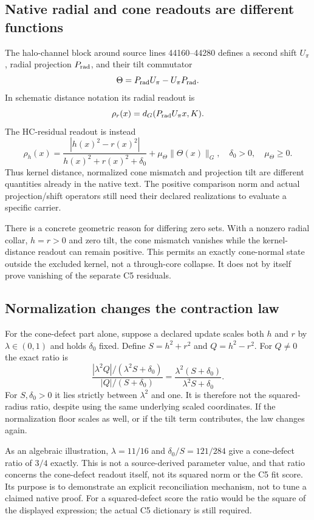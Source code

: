 \documentclass[11pt,a4paper]{article}
\begin{document}
\subsection{Native radial and cone readouts are different functions}
The halo-channel block around source lines 44160--44280 defines a second
shift $U_\pi$, radial projection $P_{\rm rad}$, and their tilt commutator
\[
\Theta=P_{\rm rad}U_\pi-U_\pi P_{\rm rad}.
\]
In schematic distance notation its radial readout is
\[
\rho_r(x)=d_G(P_{\rm rad}U_\pi x,K).
\]
The HC-residual readout is instead
\[
\rho_h(x)=\frac{|h(x)^2-r(x)^2|}{h(x)^2+r(x)^2+\delta_0}
+\mu_\Theta\|\Theta(x)\|_G,
\quad \delta_0>0,\quad\mu_\Theta\ge0.
\]
Thus kernel distance, normalized cone mismatch and projection tilt are
different quantities already in the native text. The positive comparison
norm and actual projection/shift operators still need their declared
realizations to evaluate a specific carrier.

There is a concrete geometric reason for differing zero sets. With a
nonzero radial collar, $h=r>0$ and zero tilt, the cone mismatch vanishes
while the kernel-distance readout can remain positive. This permits an
exactly cone-normal state outside the excluded kernel, not a through-core
collapse. It does not by itself prove vanishing of the separate C5 residuals.

\subsection{Normalization changes the contraction law}
For the cone-defect part alone, suppose a declared update scales both
$h$ and $r$ by $\lambda\in(0,1)$ and holds $\delta_0$ fixed. Define
$S=h^2+r^2$ and $Q=h^2-r^2$. For $Q\ne0$ the exact ratio is
\[
\frac{|\lambda^2Q|/(\lambda^2S+\delta_0)}
{|Q|/(S+\delta_0)}
=\frac{\lambda^2(S+\delta_0)}{\lambda^2S+\delta_0}.
\]
For $S,\delta_0>0$ it lies strictly between $\lambda^2$ and one.
It is therefore not the squared-radius ratio, despite using the same
underlying scaled coordinates. If the normalization floor scales as well,
or if the tilt term contributes, the law changes again.

As an algebraic illustration, $\lambda=11/16$ and
$\delta_0/S=121/284$ give a cone-defect ratio of $3/4$ exactly.
This is not a source-derived parameter value, and that ratio concerns the
cone-defect readout itself, not its squared norm or the C5 fit score.
Its purpose is to demonstrate an explicit reconciliation mechanism, not
to tune a claimed native proof. For a squared-defect score the ratio would
be the square of the displayed expression; the actual C5 dictionary is
still required.
\end{document}
